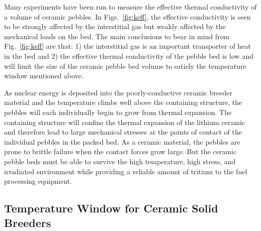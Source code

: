 Many experiments have been run to measure the effective thermal conductivity of a volume of ceramic pebbles. In Figs.~\ref{fig:keff}, the effective conductivity is seen to be strongly affected by the interstitial gas but weakly affected by the mechanical loads on the bed. The main conclusions to bear in mind from Fig.~\ref{fig:keff} are that: 1) the interstitial gas is an important transporter of heat in the bed and 2) the effective thermal conductivity of the pebble bed is low and will limit the size of the ceramic pebble bed volume to satisfy the temperature window mentioned above.


As nuclear energy is deposited into the poorly-conductive ceramic breeder material and the temperature climbs well above the containing structure, the pebbles will each individually begin to grow from thermal expansion. The containing structure will confine the thermal expansion of the lithium ceramic and therefore lead to large mechanical stresses at the points of contact of the individual pebbles in the packed bed. As a ceramic material, the pebbles are prone to brittle failure when the contact forces grow large. But the ceramic pebble beds must be able to survive the high temperature, high stress, and irradiated environment while providing a reliable amount of tritium to the fuel processing equipment.

\subsection{Temperature Window for Ceramic Solid Breeders}




